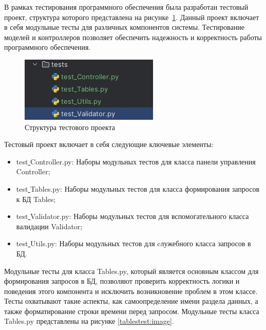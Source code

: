 В рамках тестирования программного обеспечения была разработан тестовый проект, структура которого представлена на рисунке~\ref{fig:test1}. Данный проект включает в себя модульные тесты для различных компонентов системы.
Тестирование моделей и контроллеров позволяет обеспечить надежность и корректность работы программного обеспечения. 
\begin{figure}[H]
	\centering
	\includegraphics[width=0.6\linewidth]{images/test1}
	\caption{Структура тестового проекта}
	\label{fig:test1}
\end{figure}
Тестовый проект включает в себя следующие ключевые элементы:
\begin{itemize}
	\item test\underline{ }Controller.py: Наборы модульных тестов для класса панели управления Controller;
	\item test\underline{ }Tables.py: Наборы модульных тестов для класса формирования запросов к БД Tables;
	\item test\underline{ }Validator.py: Наборы модульных тестов для вспомогательного класса валидации Validator;
	\item test\underline{ }Utils.py: Наборы модульных тестов для cлужебного класса запросов в БД.
\end{itemize}
Модульные тесты для класса Tables.py, который является основным классом для формирования запросов в БД, позволяют проверить корректность
логики и поведения этого компонента и исключить возникновение проблем в этом классе. Тесты охватывают такие аспекты, как самоопределение имени раздела данных, а также форматирование строки времени перед запросом.
Модульные тесты класса Tables.py представлены на рисунке \ref{tablestest:image}.

